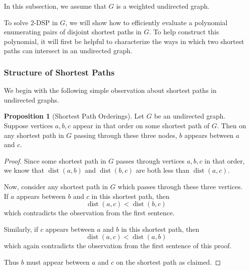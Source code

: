 \documentclass[11pt]{article}
\DeclareMathOperator{\dist}{dist}
\theoremstyle{definition}
\newtheorem{proposition}[theorem]{Proposition}
\begin{document}
In this subsection, we assume that $G$ is a weighted undirected graph.

To solve \textsf{2-DSP} in $G$, we will show how to efficiently evaluate a polynomial enumerating pairs of disjoint shortest paths in $G$.
To help construct this polynomial, it will first be helpful to characterize the ways in which two shortest paths can intersect in an undirected graph.

\subsubsection*{Structure of Shortest Paths}

We begin with the following simple observation about shortest paths in undirected graphs.

\begin{proposition}[Shortest Path Orderings]
\label{sp-orderings}
Let $G$ be an undirected graph.
    Suppose vertices $a,b,c$ appear in that order on some shortest path of $G$.
    Then on any shortest path in $G$ passing through these three nodes, $b$ appears between $a$ and $c$.    
\end{proposition}
\begin{proof}
    Since some shortest path in $G$ passes through vertices $a,b,c$ in that order, we know that $\dist(a,b)$ and $\dist(b,c)$ are both less than $\dist(a,c).$

    Now, consider any shortest path in $G$ which passes through these three vertices.
    If $a$ appears between $b$ and $c$ in this shortest path, then 
        \[\dist(a,c) < \dist(b,c)\]
    which contradicts the observation from the first sentence.
    
    Similarly, if $c$ appears between $a$ and $b$ in this shortest path, then
        \[\dist(a,c) < \dist(a,b)\]
    which again contradicts the observation  from the first sentence of this proof.

    Thus $b$ must appear between $a$ and $c$ on the shortest path as claimed.
\end{proof}

\end{document}
